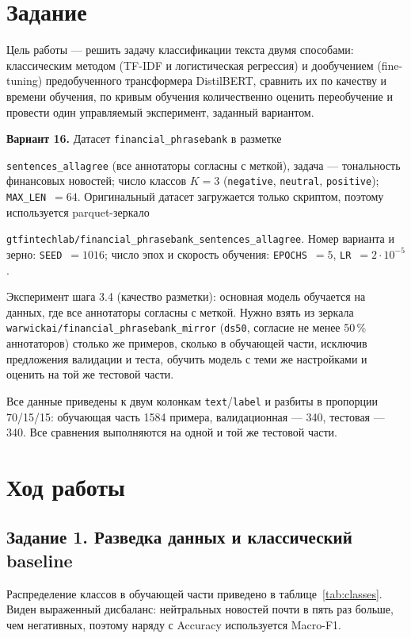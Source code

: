 \documentclass[14pt,a4paper]{extarticle}
\begin{document}
\section{Задание}

Цель работы --- решить задачу классификации текста двумя способами: классическим
методом (TF-IDF и логистическая регрессия) и дообучением (fine-tuning) предобученного
трансформера DistilBERT, сравнить их по качеству и времени обучения, по кривым
обучения количественно оценить переобучение и провести один управляемый эксперимент,
заданный вариантом.

\textbf{Вариант 16.} Датасет \texttt{financial\_phrasebank} в разметке

\texttt{sentences\_allagree} (все аннотаторы согласны с меткой), задача ---
тональность финансовых новостей; число классов $K=3$ (\texttt{negative},
\texttt{neutral}, \texttt{positive}); \texttt{MAX\_LEN}~$=64$. Оригинальный датасет
загружается только скриптом, поэтому используется parquet-зеркало

\texttt{gtfintechlab/financial\_phrasebank\_sentences\_allagree}. Номер варианта и
зерно: \texttt{SEED}~$=1016$; число эпох и скорость обучения:
\texttt{EPOCHS}~$=5$, \texttt{LR}~$=2\cdot10^{-5}$.

Эксперимент шага 3.4 (качество разметки): основная модель обучается на данных, где
все аннотаторы согласны с меткой. Нужно взять из зеркала
\texttt{warwickai/financial\_phrasebank\_mirror} (\texttt{ds50}, согласие не менее
50\,\% аннотаторов) столько же примеров, сколько в обучающей части, исключив
предложения валидации и теста, обучить модель с теми же настройками и оценить на
той же тестовой части.

Все данные приведены к двум колонкам \texttt{text}/\texttt{label} и разбиты в
пропорции 70/15/15: обучающая часть 1584 примера, валидационная --- 340,
тестовая --- 340. Все сравнения выполняются на одной и той же тестовой части.

\section{Ход работы}

\subsection{Задание 1. Разведка данных и классический baseline}

Распределение классов в обучающей части приведено в таблице~\ref{tab:classes}.
Виден выраженный дисбаланс: нейтральных новостей почти в пять раз больше, чем
негативных, поэтому наряду с Accuracy используется Macro-F1.
\end{document}

